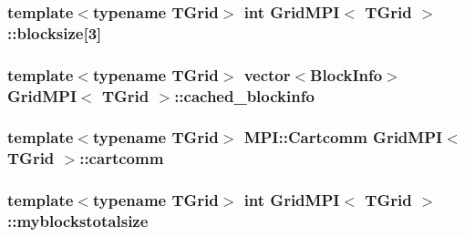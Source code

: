 \subsubsection[{blocksize}]{\setlength{\rightskip}{0pt plus 5cm}template$<$typename T\+Grid$>$ int {\bf Grid\+M\+P\+I}$<$ T\+Grid $>$\+::blocksize\mbox{[}3\mbox{]}\hspace{0.3cm}{\ttfamily [protected]}}\label{class_grid_m_p_i_a9c0c291e8619844c31afa37d884e7805}
\hypertarget{class_grid_m_p_i_ad5256ab6f6cef049008518d5d2ab7bdb}{}
\subsubsection[{cached\+\_\+blockinfo}]{\setlength{\rightskip}{0pt plus 5cm}template$<$typename T\+Grid$>$ vector$<${\bf Block\+Info}$>$ {\bf Grid\+M\+P\+I}$<$ T\+Grid $>$\+::cached\+\_\+blockinfo\hspace{0.3cm}{\ttfamily [protected]}}\label{class_grid_m_p_i_ad5256ab6f6cef049008518d5d2ab7bdb}
\hypertarget{class_grid_m_p_i_a11225861787838aeb43f9a6be7a5736b}{}
\subsubsection[{cartcomm}]{\setlength{\rightskip}{0pt plus 5cm}template$<$typename T\+Grid$>$ M\+P\+I\+::\+Cartcomm {\bf Grid\+M\+P\+I}$<$ T\+Grid $>$\+::cartcomm\hspace{0.3cm}{\ttfamily [protected]}}\label{class_grid_m_p_i_a11225861787838aeb43f9a6be7a5736b}
\hypertarget{class_grid_m_p_i_a33aea82975cdfa2b3f017ee35fab6c5b}{}
\subsubsection[{myblockstotalsize}]{\setlength{\rightskip}{0pt plus 5cm}template$<$typename T\+Grid$>$ int {\bf Grid\+M\+P\+I}$<$ T\+Grid $>$\+::myblockstotalsize\hspace{0.3cm}{\ttfamily [protected]}}\label{class_grid_m_p_i_a33aea82975cdfa2b3f017ee35fab6c5b}
\hypertarget{class_grid_m_p_i_a18238a13a4e9d9448ff9562560d5eadf}{}
